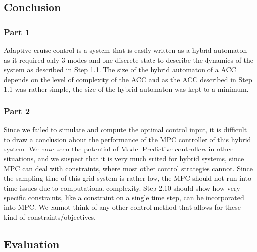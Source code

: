 \subsection*{Conclusion}
\subsubsection*{Part 1}
Adaptive cruise control is a system that is easily written as a hybrid automaton as it required only 3 modes and one discrete state to describe the dynamics of the system as described in Step 1.1. The size of the hybrid automaton of a ACC depends on the level of complexity of the ACC and as the ACC described in Step 1.1 was rather simple, the size of the hybrid automaton was kept to a minimum.   



\subsubsection*{Part 2}
Since we failed to simulate and compute the optimal control input, it is difficult to draw a conclusion about the performance of the MPC controller of this hybrid system. We have seen the potential of Model Predictive controllers in other situations, and we suspect that it is very much suited for hybrid systems, since MPC can deal with constraints, where most other control strategies cannot. Since the sampling time of this grid system is rather low, the MPC should not run into time issues due to computational complexity. Step 2.10 should show how very specific constraints, like a constraint on a single time step, can be incorporated into MPC. We cannot think of any other control method that allows for these kind of constraints/objectives.

\subsection*{Evaluation}
